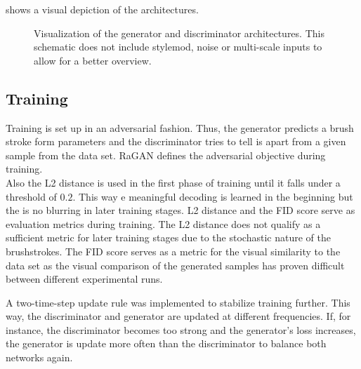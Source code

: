  shows a visual depiction of the architectures.

\begin{figure}
    \resizebox{1.5\textwidth}{!}{
        
    }
    \resizebox{1.5\textwidth}{!}{
        
    }
        \caption{Visualization of the generator and discriminator architectures. This schematic does not include stylemod, noise or multi-scale inputs to allow for a better overview.}
\end{figure}

\subsection{Training}
Training is set up in an adversarial fashion.
Thus, the generator predicts a brush stroke form parameters and the discriminator tries to tell is apart from a given sample from the data set.
RaGAN defines the adversarial objective during training.\\
Also the L2 distance is used in the first phase of training until it falls under a threshold of $0.2$.
This way e meaningful decoding is learned in the beginning but the is no blurring in later training stages.
L2 distance and the FID score serve as evaluation metrics during training.
The L2 distance does not qualify as a sufficient metric for later training stages due to the stochastic nature of the brushstrokes.
The FID score serves as a metric for the visual similarity to the data set as the visual comparison of the generated samples has proven difficult between different experimental runs.

A two-time-step update rule was implemented to stabilize training further.
This way, the discriminator and generator are updated at different frequencies.
If, for instance, the discriminator becomes too strong and the generator's loss increases, the generator is update more often than the discriminator to balance both networks again.

